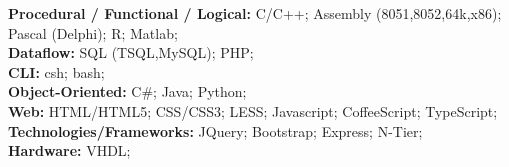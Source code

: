 

\begin{cvparagraph}
\textbf{Procedural / Functional / Logical:} C/C++; Assembly (8051,8052,64k,x86); Pascal (Delphi); R; Matlab;
\\
\textbf{Dataflow:}
SQL (TSQL,MySQL); PHP;
\\
\textbf{CLI:} csh; bash;
\\
\textbf{Object-Oriented:} C\#; Java; Python;
\\
\textbf{Web:} HTML/HTML5; CSS/CSS3; LESS; Javascript; CoffeeScript; TypeScript;
\\
\textbf{Technologies/Frameworks:} JQuery; Bootstrap; Express; N-Tier;
\\
\textbf{Hardware:} VHDL;
\end{cvparagraph}
